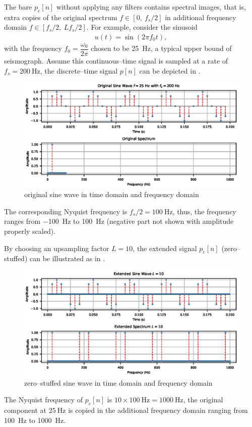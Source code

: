 The bare $p_e[n]$ without applying any filters contains spectral images, that is, extra copies of the original spectrum $f\in[0,~f_s/2]$ in additional frequency domain $f\in[f_s/2,~Lf_s/2]$. For example, consider the sinusoid
\begin{gather}
u(t)=\sin\left(2\pi{}f_0t\right),
\end{gather}
with the frequency $f_0=\dfrac{\omega_0}{2\pi}$ chosen to be \SI{25}{\hertz}, a typical upper bound of seismograph. Assume this continuous--time signal is sampled at a rate of $f_s=\SI{200}{\hertz}$, the discrete--time signal $p[n]$ can be depicted in .
\begin{figure}[htb!]
\centering
\includegraphics{PIC/PureSineOrigin}
\caption{original sine wave in time domain and frequency domain}\label{fig:original}
\end{figure}
The corresponding Nyquist frequency is $f_s/2=\SI{100}{\hertz}$, thus, the frequency ranges from \SI{-100}{\hertz} to \SI{100}{\hertz} (negative part not shown with amplitude properly scaled).

By choosing an upsampling factor $L=10$, the extended signal $p_e[n]$ (zero--stuffed) can be illustrated as in .
\begin{figure}[htb!]
\centering
\includegraphics{PIC/PureSineExtended}
\caption{zero--stuffed sine wave in time domain and frequency domain}\label{fig:extended}
\end{figure}
The Nyquist frequency of $p_e[n]$ is $10\times\SI{100}{\hertz}=\SI{1000}{\hertz}$, the original component at $\SI{25}{\hertz}$ is copied in the additional frequency domain ranging from \SI{100}{\hertz} to \SI{1000}{\hertz}.

